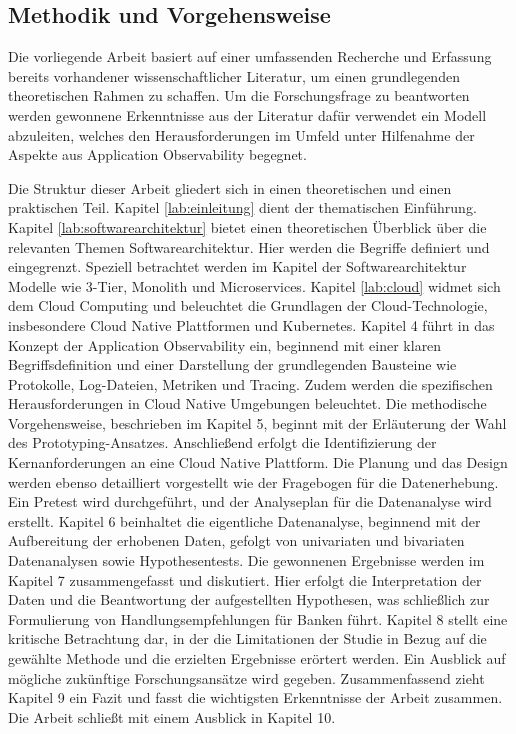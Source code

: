 \subsection{Methodik und Vorgehensweise}\label{lab:methodik}

Die vorliegende Arbeit basiert auf einer umfassenden Recherche und Erfassung bereits vorhandener wissenschaftlicher Literatur, um einen grundlegenden theoretischen Rahmen zu schaffen. Um die Forschungsfrage zu beantworten werden gewonnene Erkenntnisse aus der Literatur dafür verwendet ein Modell abzuleiten, welches den Herausforderungen im \cn Umfeld unter Hilfenahme der Aspekte aus Application Observability begegnet.


Die Struktur dieser Arbeit gliedert sich in einen theoretischen und einen praktischen Teil. Kapitel \ref{lab:einleitung} dient der thematischen Einführung. Kapitel \ref{lab:softwarearchitektur} bietet einen theoretischen Überblick über die relevanten Themen Softwarearchitektur. Hier werden die Begriffe definiert und eingegrenzt. Speziell betrachtet werden im Kapitel der Softwarearchitektur Modelle wie 3-Tier, Monolith und Microservices. Kapitel \ref{lab:cloud} widmet sich dem Cloud Computing und beleuchtet die Grundlagen der Cloud-Technologie, insbesondere Cloud Native Plattformen und Kubernetes.
Kapitel 4 führt in das Konzept der Application Observability ein, beginnend mit einer klaren Begriffsdefinition und einer Darstellung der grundlegenden Bausteine wie Protokolle, Log-Dateien, Metriken und Tracing. Zudem werden die spezifischen Herausforderungen in Cloud Native Umgebungen beleuchtet.
Die methodische Vorgehensweise, beschrieben im Kapitel 5, beginnt mit der Erläuterung der Wahl des Prototyping-Ansatzes. Anschließend erfolgt die Identifizierung der Kernanforderungen an eine Cloud Native Plattform. Die Planung und das Design werden ebenso detailliert vorgestellt wie der Fragebogen für die Datenerhebung. Ein Pretest wird durchgeführt, und der Analyseplan für die Datenanalyse wird erstellt.
Kapitel 6 beinhaltet die eigentliche Datenanalyse, beginnend mit der Aufbereitung der erhobenen Daten, gefolgt von univariaten und bivariaten Datenanalysen sowie Hypothesentests. Die gewonnenen Ergebnisse werden im Kapitel 7 zusammengefasst und diskutiert. Hier erfolgt die Interpretation der Daten und die Beantwortung der aufgestellten Hypothesen, was schließlich zur Formulierung von Handlungsempfehlungen für Banken führt.
Kapitel 8 stellt eine kritische Betrachtung dar, in der die Limitationen der Studie in Bezug auf die gewählte Methode und die erzielten Ergebnisse erörtert werden. Ein Ausblick auf mögliche zukünftige Forschungsansätze wird gegeben.
Zusammenfassend zieht Kapitel 9 ein Fazit und fasst die wichtigsten Erkenntnisse der Arbeit zusammen. Die Arbeit schließt mit einem Ausblick in Kapitel 10.

